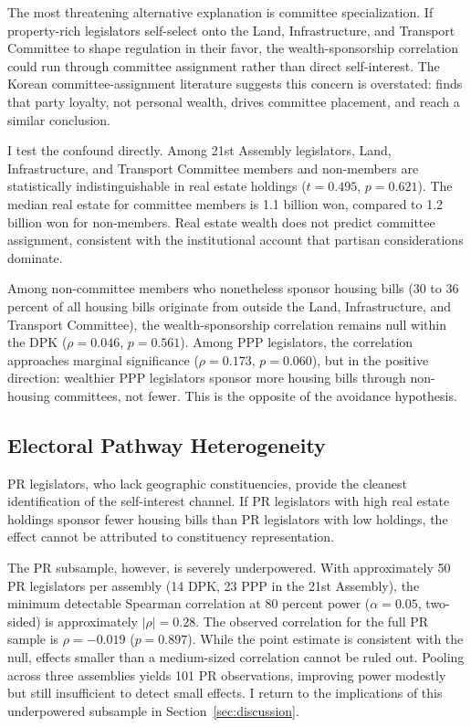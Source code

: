 \documentclass[11pt]{article}
\begin{document}
The most threatening alternative explanation is committee specialization. If property-rich legislators self-select onto the Land, Infrastructure, and Transport Committee to shape regulation in their favor, the wealth-sponsorship correlation could run through committee assignment rather than direct self-interest. The Korean committee-assignment literature suggests this concern is overstated: \citet{kang2024} finds that party loyalty, not personal wealth, drives committee placement, and \citet{choikoo2018} reach a similar conclusion.

I test the confound directly. Among 21st Assembly legislators, Land, Infrastructure, and Transport Committee members and non-members are statistically indistinguishable in real estate holdings ($t = 0.495$, $p = 0.621$). The median real estate for committee members is 1.1 billion won, compared to 1.2 billion won for non-members. Real estate wealth does not predict committee assignment, consistent with the institutional account that partisan considerations dominate.

Among non-committee members who nonetheless sponsor housing bills (30 to 36 percent of all housing bills originate from outside the Land, Infrastructure, and Transport Committee), the wealth-sponsorship correlation remains null within the DPK ($\rho = 0.046$, $p = 0.561$). Among PPP legislators, the correlation approaches marginal significance ($\rho = 0.173$, $p = 0.060$), but in the positive direction: wealthier PPP legislators sponsor more housing bills through non-housing committees, not fewer. This is the opposite of the avoidance hypothesis.

\subsection{Electoral Pathway Heterogeneity}

PR legislators, who lack geographic constituencies, provide the cleanest identification of the self-interest channel. If PR legislators with high real estate holdings sponsor fewer housing bills than PR legislators with low holdings, the effect cannot be attributed to constituency representation.

The PR subsample, however, is severely underpowered. With approximately 50 PR legislators per assembly (14 DPK, 23 PPP in the 21st Assembly), the minimum detectable Spearman correlation at 80 percent power ($\alpha = 0.05$, two-sided) is approximately $|\rho| = 0.28$. The observed correlation for the full PR sample is $\rho = -0.019$ ($p = 0.897$). While the point estimate is consistent with the null, effects smaller than a medium-sized correlation cannot be ruled out. Pooling across three assemblies yields 101 PR observations, improving power modestly but still insufficient to detect small effects. I return to the implications of this underpowered subsample in Section~\ref{sec:discussion}.
\end{document}

